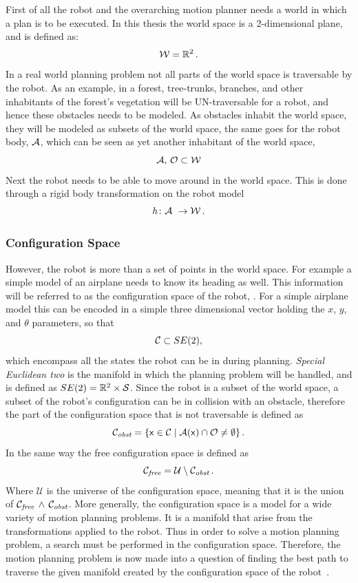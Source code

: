 First of all the robot and the overarching motion planner needs a world in which
a plan is to be executed. In this thesis the world space is a 2-dimensional
plane, and is defined as:
\[
  \mathcal{W} = \mathbb{R}^2 \, .
\]
In a real world planning problem not all parts of the world space is traversable
by the robot. As an example, in a forest, tree-trunks, branches, and other
inhabitants of the forest's vegetation will be UN-traversable for a robot, and
hence these obstacles needs to be modeled. As obstacles inhabit the world space,
they will be modeled as subsets of the world space, the same goes for the robot
body, \(\mathcal{A}{}\), which can be seen as yet another inhabitant of the
world space, \ie
\[
  \mathcal{A},\, \mathcal{O} \subset \mathcal{W}
\]
Next the robot needs to be able to move around in the world space. This is done
through a rigid body transformation on the robot model
\[
  h \colon \modelrobot\ \rightarrow \modelworld \mathEoS
\]


\subsubsection{Configuration Space}

However, the robot is more than a set of points in the world space. For example
a simple model of an airplane needs to know its heading as well. This
information will be referred to as the configuration space of the robot,
\modelconfigurationspace. For a simple airplane model this can be encoded in a
simple three dimensional vector holding the \(x\), \(y\), and \(\theta\)
parameters, so that
\[
  \mathcal{C} \subset SE(2),
\]
which encompass all the states the robot can be in during planning.
\textit{Special Euclidean two} is the manifold in which the planning problem
will be handled, and is defined as \(SE(2) = \mathbb{R}^2 \times \mathcal{S}\). Since
the robot is a subset of the world space, a subset of the robot's configuration
can be in collision with an obstacle, therefore the part of the configuration
space that is not traversable is defined as
\[
  \mathcal{C}_{\textit{obst}}{} = \lbrace{\mathbf{\mathsf{x}}} \in \mathcal{C}{} \mid
    \mathcal{A}({\mathbf{\mathsf{x}}}) \cap \mathcal{O}{} \neq \emptyset\rbrace \, .
\]
In the same way the free configuration space is defined as
\[
  \mathcal{C}_{\textit{free}}{} = \mathcal{U} \setminus
  \mathcal{C}_{\textit{obst}}{} \, .
\]
Where \(\mathcal{U}\) is the universe of the configuration space, meaning that
it is the union of \(\mathcal{C}_{\textit{free}}\, \wedge \,
\mathcal{C}_{\textit{obst}}\). More generally, the configuration space is a
model for a wide variety of motion planning problems. It is a manifold that
arise from the transformations applied to the robot. Thus in order to solve a
motion planning problem, a search must be performed in the configuration space.
Therefore, the motion planning problem is now made into a question of finding
the best path to traverse the given manifold created by the configuration space
of the robot~\cite{Lav06}.


